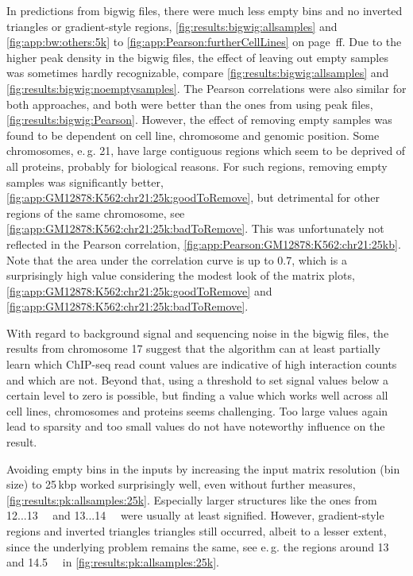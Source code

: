 In predictions from bigwig files, there were much less empty bins and no inverted triangles or gradient-style regions, 
\autoref{fig:results:bigwig:allsamples} and \autoref{fig:app:bw:others:5k} to \ref{fig:app:Pearson:furtherCellLines} 
on page \pageref{fig:app:bw:others:5k}\,ff.
Due to the higher peak density in the bigwig files, the effect of leaving out 
empty samples was sometimes hardly recognizable, compare \autoref{fig:results:bigwig:allsamples} and \ref{fig:results:bigwig:noemptysamples}.
The Pearson correlations were also similar for both approaches, and both were better than the ones from using peak files, 
\autoref{fig:results:bigwig:Pearson}.
However, the effect of removing empty samples was found to be dependent on cell line, chromosome and genomic position. 
Some chromosomes, e.\,g. 21, have large contiguous regions which seem to be deprived of all proteins,
probably for biological reasons.
For such regions, removing empty samples was significantly better, \autoref{fig:app:GM12878:K562:chr21:25k:goodToRemove}, 
but detrimental for other regions of the same chromosome, see \autoref{fig:app:GM12878:K562:chr21:25k:badToRemove}.
This was unfortunately not reflected in the Pearson correlation, \autoref{fig:app:Pearson:GM12878:K562:chr21:25kb}.
Note that the area under the correlation curve is up to 0.7, which is a surprisingly high value considering
the modest look of the matrix plots, \autoref{fig:app:GM12878:K562:chr21:25k:goodToRemove} 
and \ref{fig:app:GM12878:K562:chr21:25k:badToRemove}.

With regard to background signal and sequencing noise in the bigwig files, 
the results from chromosome 17 suggest that the algorithm can at least partially 
learn which ChIP-seq read count values are indicative of high interaction counts and which are not. 
Beyond that, using a threshold to set signal values below a certain level to zero is possible,
but finding a value which works well across all cell lines, chromosomes and proteins seems challenging.
Too large values again lead to sparsity and too small values
do not have noteworthy influence on the result.

Avoiding empty bins in the inputs by increasing the input matrix resolution (bin size) to 25\,kbp 
worked surprisingly well, even without further measures, \autoref{fig:results:pk:allsamples:25k}.
Especially larger structures like the ones from 12...\SI{13}{\mega\bp} and 13...\SI{14}{\mega\bp} were usually at least signified.
However, gradient-style regions and inverted triangles triangles still occurred, albeit to a lesser extent, 
since the underlying problem remains the same, see e.\,g. the regions around 13 and \SI{14.5}{\mega\bp}
in \autoref{fig:results:pk:allsamples:25k}.

